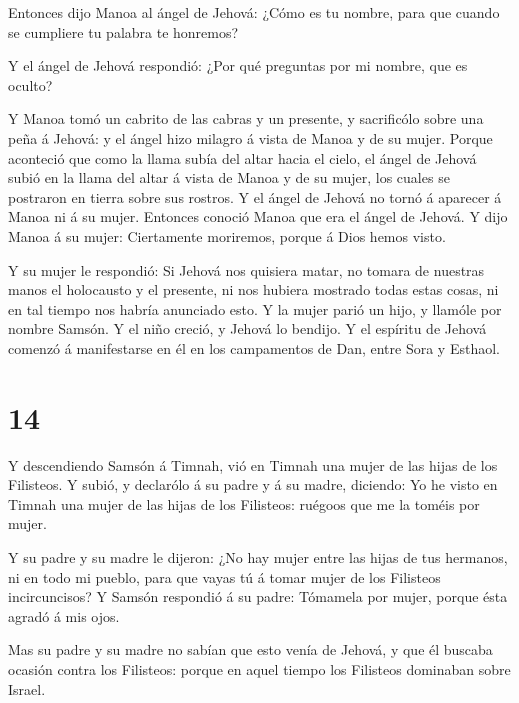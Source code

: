  Entonces dijo Manoa al ángel de Jehová: ¿Cómo es tu
nombre, para que cuando se cumpliere tu palabra te honremos?

 Y el ángel de Jehová respondió: ¿Por qué preguntas por mi
nombre, que es oculto?

 Y Manoa tomó un cabrito de las cabras y un presente, y
sacrificólo sobre una peña á Jehová: y el ángel hizo milagro á vista de
Manoa y de su mujer.  Porque aconteció que como la llama
subía del altar hacia el cielo, el ángel de Jehová subió en la llama del
altar á vista de Manoa y de su mujer, los cuales se postraron en tierra
sobre sus rostros.  Y el ángel de Jehová no tornó á
aparecer á Manoa ni á su mujer. Entonces conoció Manoa que era el ángel
de Jehová.  Y dijo Manoa á su mujer: Ciertamente moriremos,
porque á Dios hemos visto.

 Y su mujer le respondió: Si Jehová nos quisiera matar, no
tomara de nuestras manos el holocausto y el presente, ni nos hubiera
mostrado todas estas cosas, ni en tal tiempo nos habría anunciado esto.
 Y la mujer parió un hijo, y llamóle por nombre Samsón. Y
el niño creció, y Jehová lo bendijo.  Y el espíritu de
Jehová comenzó á manifestarse en él en los campamentos de Dan, entre
Sora y Esthaol.

\hypertarget{section-13}{%
\section{14}\label{section-13}}

 Y descendiendo Samsón á Timnah, vió en Timnah una mujer de
las hijas de los Filisteos.  Y subió, y declarólo á su padre
y á su madre, diciendo: Yo he visto en Timnah una mujer de las hijas de
los Filisteos: ruégoos que me la toméis por mujer.

 Y su padre y su madre le dijeron: ¿No hay mujer entre las
hijas de tus hermanos, ni en todo mi pueblo, para que vayas tú á tomar
mujer de los Filisteos incircuncisos? Y Samsón respondió á su padre:
Tómamela por mujer, porque ésta agradó á mis ojos.

 Mas su padre y su madre no sabían que esto venía de Jehová,
y que él buscaba ocasión contra los Filisteos: porque en aquel tiempo
los Filisteos dominaban sobre Israel.

